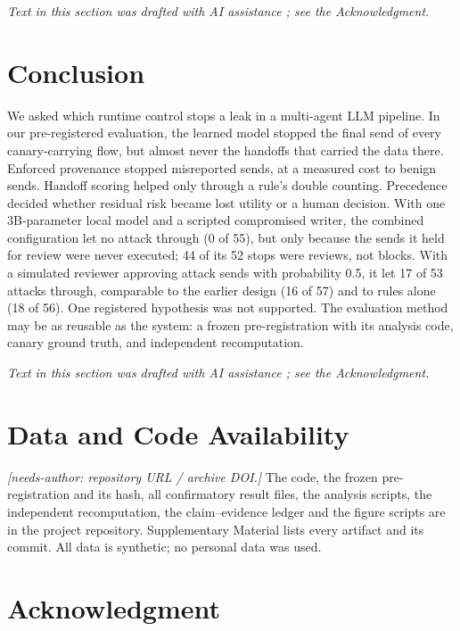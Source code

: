 \documentclass{ieeeaccess}
\begin{document}
\emph{Text in this section was drafted with AI assistance \cite{claude}; see the Acknowledgment.}

\section{Conclusion}\label{sec:IX}


We asked which runtime control stops a leak in a multi-agent LLM pipeline. In our pre-registered evaluation, the learned model stopped the final send of every canary-carrying flow, but almost never the handoffs that carried the data there. %
Enforced provenance stopped misreported sends, at a measured cost to benign sends. %
Handoff scoring helped only through a rule's double counting. %
Precedence decided whether residual risk became lost utility or a human decision. %
With one 3B-parameter local model and a scripted compromised writer, the combined configuration let no attack through (0 of 55), but only because the sends it held for review were never executed; 44 of its 52 stops were reviews, not blocks. %
With a simulated reviewer approving attack sends with probability 0.5, it let 17 of 53 attacks through, comparable to the earlier design (16 of 57) and to rules alone (18 of 56). %
One registered hypothesis was not supported. %
The evaluation method may be as reusable as the system: a frozen pre-registration with its analysis code, canary ground truth, and independent recomputation.

\emph{Text in this section was drafted with AI assistance \cite{claude}; see the Acknowledgment.}

\section*{Data and Code Availability}

\emph{[needs-author: repository URL / archive DOI.]} The code, the frozen pre-registration and its hash, all confirmatory result files, the analysis scripts, the independent recomputation, the claim--evidence ledger and the figure scripts are in the project repository. Supplementary Material lists every artifact and its commit. All data is synthetic; no personal data was used.

\section*{Acknowledgment}
\end{document}
